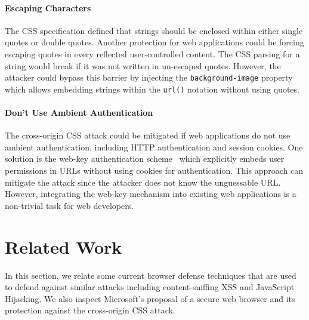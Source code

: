 \documentclass{acm_proc_article-sp}
\begin{document}
\paragraph{Escaping Characters}
The CSS specification defined that strings should be enclosed within either single quotes or double quotes. Another protection for web applications could be forcing escaping quotes in every reflected user-controlled content. The CSS parsing for a string would break if it was not written in un-escaped quotes. However, the attacker could bypass this barrier by injecting the \texttt{background-image} property which allows embedding strings within the \texttt{url()} notation without using quotes.

\paragraph{Don't Use Ambient Authentication}
The cross-origin CSS attack could be mitigated if web applications do not use ambient authentication, including HTTP authentication and session cookies. One solution is the web-key authentication scheme~\cite{webkey} which explicitly embeds user permissions in URLs without using cookies for authentication. This approach can mitigate the attack since the attacker does not know the unguessable URL. However, integrating the web-key mechanism into existing web applications is a non-trivial task for web developers.

\section{Related Work} \label{sec:relatedwork}
In this section, we relate some current browser defense techniques that are used to defend against similar attacks including content-sniffing XSS and JavaScript Hijacking. We also inspect Microsoft's proposal of a secure web browser and its protection against the cross-origin CSS attack.
\end{document}
